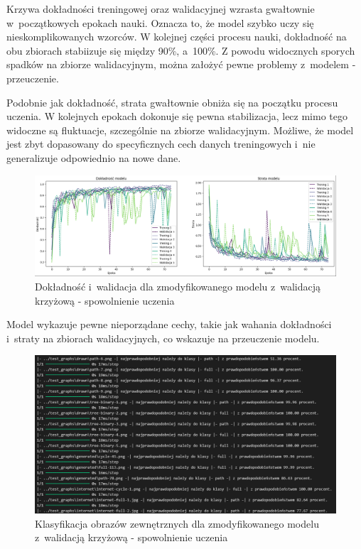 Krzywa dokładności treningowej oraz walidacyjnej wzrasta gwałtownie w~początkowych epokach nauki.
Oznacza to, że model szybko uczy się nieskomplikowanych wzorców.
W kolejnej części procesu nauki, dokładność na obu zbiorach stabiizuje się między 90\%, a~100\%.
Z powodu widocznych sporych spadków na zbiorze walidacyjnym, można założyć pewne problemy z~modelem - przeuczenie.

Podobnie jak dokładność, strata gwałtownie obniża się na początku procesu uczenia.
W kolejnych epokach dokonuje się pewna stabilizacja, lecz mimo tego widoczne są fluktuacje, szczególnie na zbiorze walidacyjnym.
Możliwe, że model jest zbyt dopasowany do specyficznych cech danych treningowych i~nie generalizuje odpowiednio na nowe dane.

\begin{figure}[ht]
	\centering
	\includegraphics[width=15.5cm]{resources/tests/images/v4/crossvalid_4_img.png}
	\caption{Dokładność i~walidacja dla zmodyfikowanego modelu z~walidacją krzyżową - spowolnienie uczenia}
	\label{Fig:tests-cv-4a}
\end{figure}
\FloatBarrier

Model wykazuje pewne nieporządane cechy, takie jak wahania dokładności i~straty na zbiorach walidacyjnych,
co wskazuje na przeuczenie modelu.

\begin{figure}[ht]
	\centering
	\includegraphics[width=15.5cm]{resources/tests/images/v4/crossvalid_4_txt.png}
	\caption{Klasyfikacja obrazów zewnętrznych dla zmodyfikowanego modelu z~walidacją krzyżową - spowolnienie uczenia}
	\label{Fig:tests-cv-4b}
\end{figure}
\FloatBarrier

